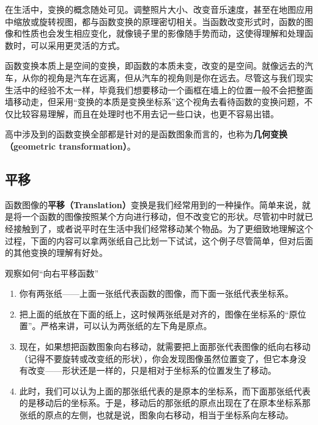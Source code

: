 
\begin{issues}
\issueDraft
\end{issues}


在生活中，变换的概念随处可见。调整照片大小、改变音乐速度，甚至在地图应用中缩放或旋转视图，都与函数变换的原理密切相关。当函数改变形式时，函数的图像和性质也会发生相应变化，就像镜子里的影像随手势而动，这使得理解和处理函数时，可以采用更灵活的方式。

函数变换本质上是空间的变换，即函数的本质未变，改变的是空间。就像远去的汽车，从你的视角是汽车在远离，但从汽车的视角则是你在远去。尽管这与我们现实生活中的经验不太一样，毕竟我们想要移动一个画框在墙上的位置一般不会把整面墙移动走，但采用“变换的本质是变换坐标系”这个视角去看待函数的变换问题，不仅比较容易理解，而且在处理时也不用去记一些口诀，也更不容易出错。

高中涉及到的函数变换全部都是针对的是函数图象而言的，也称为\textbf{几何变换（geometric transformation）}。

\subsection{平移}\label{sub_FunTra_1}

函数图像的\textbf{平移（Translation）}变换是我们经常用到的一种操作。简单来说，就是将一个函数的图像按照某个方向进行移动，但不改变它的形状。尽管初中时就已经接触到了，或者说平时在生活中我们经常移动某个物品。为了更细致地理解这个过程，下面的内容可以拿两张纸自己比划一下试试，这个例子尽管简单，但对后面的其他变换的理解有好处。

\begin{example}{观察如何“向右平移函数”}
\begin{enumerate}
\item 你有两张纸——上面一张纸代表函数的图像，而下面一张纸代表坐标系。
\item 把上面的纸放在下面的纸上，这时候两张纸是对齐的，图像在坐标系的“原位置”。严格来讲，可以认为两张纸的左下角是原点。
\item 现在，如果想把函数图象向右移动，就需要把上面那张代表图像的纸向右移动（记得不要旋转或改变纸的形状），你会发现图像虽然位置变了，但它本身没有改变——形状还是一样的，只是相对于坐标系的位置发生了移动。
\item 此时，我们可以认为上面的那张纸代表的是原本的坐标系，而下面那张纸代表的是移动后的坐标系。于是，移动后的那张纸的原点出现在了在原本坐标系那张纸的原点的左侧，也就是说，图象向右移动，相当于坐标系向左移动。
\end{enumerate}
\end{example}

